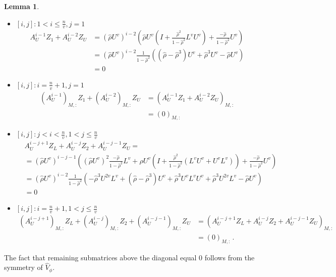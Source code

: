 \documentclass[11pt,dvipsnames]{article}
\newtheorem{lemma}{Lemma}
\begin{document}
\begin{appendices}
\begin{lemma}
\begin{itemize}
\begin{equation}
\begin{split}
&=(I)_{M,M}
\end{split}
\end{equation}
\item $ [i,j]: 1 < i \leq \frac{n}{v},j=1 $
\begin{equation}
\begin{split}
A_{U}^{i-1}Z_{1}+A_{U}^{i-2}Z_{U}&=\left(\hat{\rho} U^{v}\right)^{i-2}\left(\hat{\rho} U^{v}\left( I+\frac{\hat{\rho}^{2}}{1-\hat{\rho}^{2}}L^{v}U^{v}\right) + \frac{-\hat{\rho}}{1-\hat{\rho}^{2}} U^{v} \right) \\
&=\left(\hat{\rho} U^{v}\right)^{i-2}\frac{1}{1-\hat{\rho}^{2}}\left( \left( \hat{\rho}-\hat{\rho}^{3}\right)U^{v}+\hat{\rho}^{3}U^{v}-\hat{\rho}U^{v} \right) \\
&=0
\end{split}
\end{equation}
\item $ [i,j]: i = \frac{n}{v}+1,j=1 $
\begin{equation}
\begin{split}
(A_{U}^{i-1})_{M,:}Z_{1}+(A_{U}^{i-2})_{M,:}Z_{U}&=(A_{U}^{i-1}Z_{1}+A_{U}^{i-2}Z_{U})_{M,:} \\
&=(0)_{M,:}
\end{split}
\end{equation}
\item $ [i,j]: j < i < \frac{n}{v},1 < j \leq \frac{n}{v} $
\begin{equation}
\begin{split}
&A_{U}^{i-j+1}Z_{L}+A_{U}^{i-j}Z_{2}+A_{U}^{i-j-1}Z_{U}=\\
&=\left(\hat{\rho} U^{v}\right)^{i-j-1}\left( \left(\hat{\rho} U^{v}\right)^{2} \frac{-\hat{\rho}}{1-\hat{\rho}^{2}} L^{v} + \hat{\rho} U^{v}\left( I+\frac{\hat{\rho}^{2}}{1-\hat{\rho}^{2}}\left( L^{v}U^{v}+U^{v}L^{v}\right) \right)+ \frac{-\hat{\rho}}{1-\hat{\rho}^{2}} U^{v}  \right) \\
&=\left(\hat{\rho} U^{v}\right)^{i-2}\frac{1}{1-\hat{\rho}^{2}}\left( -\hat{\rho}^{3} U^{2v}L^{v}+ \left( \hat{\rho}-\hat{\rho}^{3}\right)U^{v} + \hat{\rho}^{3}U^{v}L^{v}U^{v}+ \hat{\rho}^{3}U^{2v}L^{v}-\hat{\rho}U^{v} \right)\\
&=0
\end{split}
\end{equation}
\item $ [i,j]:  i = \frac{n}{v}+1,1 < j \leq \frac{n}{v} $
\begin{equation}
\begin{split}
(A_{U}^{i-j+1})_{M,:}Z_{L}+(A_{U}^{i-j})_{M,:}Z_{2}+(A_{U}^{i-j-1})_{M,:}Z_{U}&=(A_{U}^{i-j+1}Z_{L}+A_{U}^{i-j}Z_{2}+A_{U}^{i-j-1}Z_{U})_{M,:}\\
&=(0)_{M,:}\,.
\end{split}
\end{equation}
\end{itemize}
\end{lemma}
The fact that remaining submatrices above the diagonal equal $ 0 $ follows from the symmetry of $ \widehat{V}_{\phi} $.


\end{appendices}
\end{document}
